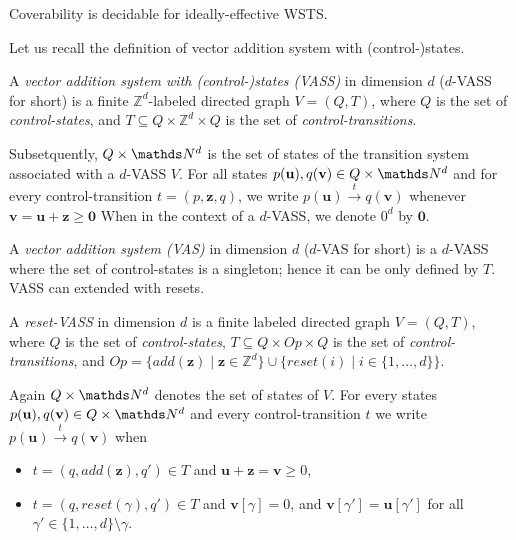 \documentclass[runningheads]{llncs}
\begin{document}
\begin{theorem} \cite{BFM-ic17}
Coverability is decidable for ideally-effective WSTS.
\end{theorem}

Let us recall the  definition of vector addition system with (control-)states. 
 \begin{definition} 
A {\em vector addition system with (control-)states (VASS)} in dimension $d$ ($d$-VASS for short) is a finite $\mathds{Z}^d$-labeled directed graph $V = (Q,T)$, where $Q$ is the set of {\em control-states}, and $T \subseteq Q \times \mathds{Z}^d \times Q$ is the set of {\em control-transitions}. 
 \end{definition} 
%
Subsetquently, $Q \times \N^d$ is the set of states of the transition system associated with a $d$-VASS $V$.
For all states $p(\textbf{u}), q(\textbf{v}) \in Q \times \N^d$ and for every control-transition $t = (p, \textbf{z}, q)$, we write $p(\textbf{u}) \xrightarrow{t} q(\textbf{v})$ whenever $\textbf{v} = \textbf{u} + \textbf{z} \geq \textbf{0}$
%
When in the context of a $d$-VASS, we denote $0^d$ by $\textbf{0}$.

A {\em vector addition system (VAS)} in dimension $d$ ($d$-VAS for short) is a $d$-VASS where the set of control-states is a singleton; hence it can be only defined by $T$.\\

VASS can extended with resets.

\begin{definition}
A {\em reset-VASS} in dimension $d$ 
 is a finite 
labeled directed graph $V = (Q,T)$, where $Q$ is the set of {\em control-states}, 
$T \subseteq Q \times Op \times Q$
is the set of {\em control-transitions}, and $Op = \{ add(\textbf{z}) \mid \textbf{z} \in \mathds{Z}^d\} \cup 
		\{ reset(i) \mid i \in \{1,\ldots,d\} \}$.
\end{definition}

Again $Q \times \N^d$
 denotes the set of states of $V$.
For every states $p(\textbf{u}), q(\textbf{v}) \in Q \times \N^d$ and every control-transition $t$ we write
$p(\textbf{u}) \xrightarrow{t} q(\textbf{v})$ when 
\begin{samepage}\begin{itemize}
\item  $t = (q,add(\textbf{z}),q') \in T$
and $\textbf{u}+\textbf{z} = \textbf{v} \geq 0$,
\item $t = (q,reset(\gamma),q') \in T$ 
and
$\textbf{v}[\gamma] = 0$, and $\textbf{v}[\gamma'] = \textbf{u}[\gamma']$ for all $\gamma' \in \{1,\ldots, d\} \setminus \gamma$.
\end{itemize} \end{samepage}
\end{document}
